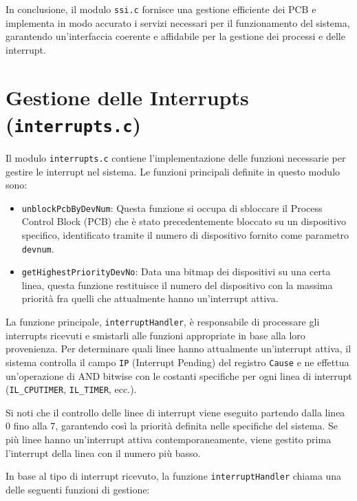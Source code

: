 \documentclass[a4paper]{article}
\begin{document}
In conclusione, il modulo \texttt{ssi.c} fornisce una gestione efficiente dei PCB e implementa in modo accurato i servizi necessari per il funzionamento del sistema, garantendo un'interfaccia coerente e affidabile per la gestione dei processi e delle interrupt.

\section{Gestione delle Interrupts (\texttt{interrupts.c})}

Il modulo \texttt{interrupts.c} contiene l'implementazione delle funzioni necessarie per gestire le interrupt nel sistema. Le funzioni principali definite in questo modulo sono:

\begin{itemize}
\item \texttt{unblockPcbByDevNum}: Questa funzione si occupa di sbloccare il Process Control Block (PCB) che è stato precedentemente bloccato su un dispositivo specifico, identificato tramite il numero di dispositivo fornito come parametro \texttt{devnum}.

\item \texttt{getHighestPriorityDevNo}: Data una bitmap dei dispositivi su una certa linea, questa funzione restituisce il numero del dispositivo con la massima priorità fra quelli che attualmente hanno un'interrupt attiva.

\end{itemize}

La funzione principale, \texttt{interruptHandler}, è responsabile di processare gli interrupts ricevuti e smistarli alle funzioni appropriate in base alla loro provenienza. Per determinare quali linee hanno attualmente un'interrupt attiva, il sistema controlla il campo \texttt{IP} (Interrupt Pending) del registro \texttt{Cause} e ne effettua un'operazione di AND bitwise con le costanti specifiche per ogni linea di interrupt (\verb+IL_CPUTIMER+, \verb+IL_TIMER+, ecc.).

Si noti che il controllo delle linee di interrupt viene eseguito partendo dalla linea 0 fino alla 7, garantendo così la priorità definita nelle specifiche del sistema. Se più linee hanno un'interrupt attiva contemporaneamente, viene gestito prima l'interrupt della linea con il numero più basso.

In base al tipo di interrupt ricevuto, la funzione \texttt{interruptHandler} chiama una delle seguenti funzioni di gestione:
\end{document}
